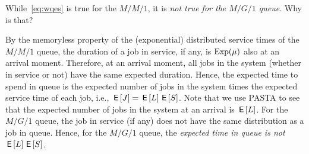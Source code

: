\documentclass[stochastic-or.tex]{subfiles}
\begin{document}






\begin{exercise}\label{ex:l-216}
While~\cref{eq:wqes} is true for the $M/M/1$, it is \emph{not true for the $M/G/1$ queue}. Why is that?
\begin{solution}
 By the memoryless property of the (exponential) distributed service times of the $M/M/1$ queue, the duration of a job in service, if any, is $\mathrm{Exp}(\mu)$ also at an arrival moment.
 Therefore, at an arrival moment, all jobs in the system (whether in service or not) have the same expected duration.
 Hence, the expected time to spend in queue is the expected number of jobs in the system times the expected service time of each job, i.e., $\,\mathsf{E}\left[J\right] = \,\mathsf{E}\left[L\right] \,\mathsf{E}\left[S\right]$.
 Note that we use PASTA to see that the expected number of jobs in the system at an arrival is $\,\mathsf{E}\left[L\right]$.
 For the $M/G/1$ queue, the job in service (if any) does not have the same distribution as a job in queue.
 Hence, for the $M/G/1$ queue, the \emph{expected time in queue is not} $\,\mathsf{E}\left[L\right] \,\mathsf{E}\left[S\right]$.
\end{solution}
\end{exercise}



\end{document}
